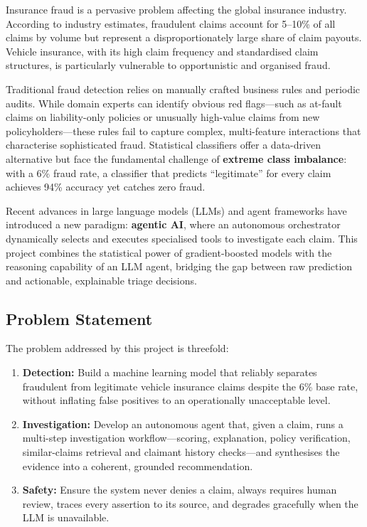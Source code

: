 \documentclass[12pt,a4paper]{article}
\begin{document}
Insurance fraud is a pervasive problem affecting the global insurance industry.  According to industry estimates, fraudulent claims account for 5--10\% of all claims by volume but represent a disproportionately large share of claim payouts.  Vehicle insurance, with its high claim frequency and standardised claim structures, is particularly vulnerable to opportunistic and organised fraud.

Traditional fraud detection relies on manually crafted business rules and periodic audits.  While domain experts can identify obvious red flags---such as at-fault claims on liability-only policies or unusually high-value claims from new policyholders---these rules fail to capture complex, multi-feature interactions that characterise sophisticated fraud.  Statistical classifiers offer a data-driven alternative but face the fundamental challenge of \textbf{extreme class imbalance}: with a 6\% fraud rate, a classifier that predicts ``legitimate'' for every claim achieves 94\% accuracy yet catches zero fraud.

Recent advances in large language models (LLMs) and agent frameworks have introduced a new paradigm: \textbf{agentic AI}, where an autonomous orchestrator dynamically selects and executes specialised tools to investigate each claim.  This project combines the statistical power of gradient-boosted models with the reasoning capability of an LLM agent, bridging the gap between raw prediction and actionable, explainable triage decisions.

\subsection{Problem Statement}

The problem addressed by this project is threefold:

\begin{enumerate}[label=(\alph*)]
    \item \textbf{Detection:} Build a machine learning model that reliably separates fraudulent from legitimate vehicle insurance claims despite the 6\% base rate, without inflating false positives to an operationally unacceptable level.
    \item \textbf{Investigation:} Develop an autonomous agent that, given a claim, runs a multi-step investigation workflow---scoring, explanation, policy verification, similar-claims retrieval and claimant history checks---and synthesises the evidence into a coherent, grounded recommendation.
    \item \textbf{Safety:} Ensure the system never denies a claim, always requires human review, traces every assertion to its source, and degrades gracefully when the LLM is unavailable.
\end{enumerate}
\end{document}
